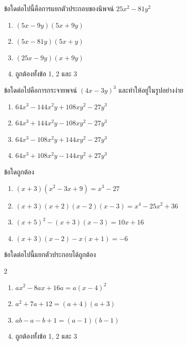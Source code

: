 \begin{examplebox}
	ข้อใดต่อไปนี้คือการแยกตัวประกอบของนิพจน์ $25 x^2-81 y^2$
	\begin{enumerate}
		\item $(5 x-9 y)(5 x+9 y)$
		\item $(5 x-81 y)(5 x+y)$
		\item $(25 x-9 y)(x+9 y)$
		\item ถูกต้องทั้งข้อ 1, 2 และ 3
	\end{enumerate}
\end{examplebox}

\begin{examplebox}
	ข้อใดต่อไปคือการกระจายพจน์ $(4 x-3 y)^3$ และทำให้อยู่ในรูปอย่างง่าย
	\begin{enumerate}
		\item $64 x^3-144 x^2 y+108 x y^2-27 y^3$
		\item $64 x^3+144 x^2 y-108 x y^2-27 y^3$
		\item $64 x^3-108 x^2 y+144 x y^2-27 y^3$
		\item $64 x^3+108 x^2 y-144 x y^2+27 y^3$
	\end{enumerate}
\end{examplebox}


\begin{examplebox}
	ข้อใดถูกต้อง
	\begin{enumerate}
		\item $(x+3)\left(x^2-3 x+9\right)=x^3-27$
		\item $(x+3)(x+2)(x-2)(x-3)=x^4-25 x^2+36$
		\item $(x+5)^2-(x+3)(x-3)=10 x+16$
		\item $(x+3)(x-2)-x(x+1)=-6$
	\end{enumerate}
\end{examplebox}


\begin{examplebox}
	ข้อใดต่อไปนี้แยกตัวประกอบได้ถูกต้อง
	\begin{multicols}{2}
		\begin{enumerate}
			\item $a x^2-8 a x+16 a=a(x-4)^2$
			\item $a^2+7 a+12=(a+4)(a+3)$
			\item $a b-a-b+1=(a-1)(b-1)$
			\item ถูกต้องทั้งข้อ 1, 2 และ 3
		\end{enumerate}
	\end{multicols}
\end{examplebox}

